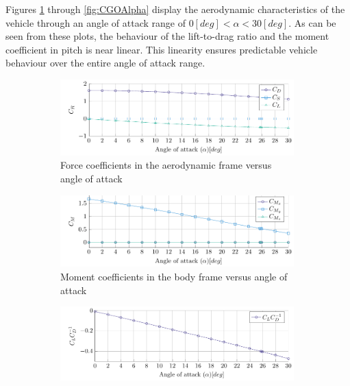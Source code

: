  Figures \ref{fig:CLCDCSAlpha} through \ref{fig:CGOAlpha} display the aerodynamic characteristics of the vehicle through an angle of attack range of $0 \left[deg\right]<\alpha<30 \left[deg\right]$. As can be seen from these plots, the behaviour of the lift-to-drag ratio and the moment coefficient in pitch is near linear. This linearity ensures predictable vehicle behaviour over the entire angle of attack range.
 
 \begin{figure}[h]
 	\centering
 	
 	\begin{subfigure}[b]{0.49\textwidth}
 		\includegraphics[width=0.99\textwidth]{./Figure/Aerodynamics/CDCSCLAlpha.pdf}
 		\caption{Force coefficients in the aerodynamic frame versus angle of attack}
 		\label{fig:CLCDCSAlpha}
 	\end{subfigure}
 	\begin{subfigure}[b]{0.49\textwidth}
 		\includegraphics[width=0.99\textwidth]{./Figure/Aerodynamics/CMXCMYCMZAlpha.pdf}
 		\caption{Moment coefficients in the body frame versus angle of attack}
 		\label{fig:CMxCMyCMzAlpha}
 	\end{subfigure}
 	\begin{subfigure}[b]{0.49\textwidth}
 		\includegraphics[width=0.99\textwidth]{./Figure/Aerodynamics/CLCDAlpha.pdf}

\end{subfigure}
\end{figure}
